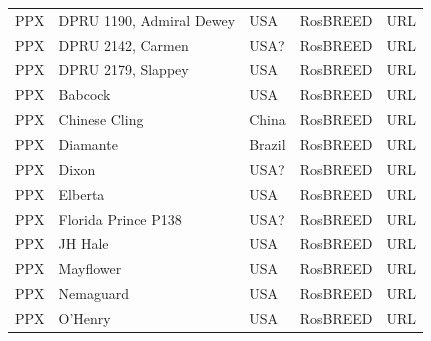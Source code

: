 \documentclass[12pt]{article}
\begin{document}
{\begin{center}
\begin{longtable}{lllll}
                 PP{\color{red}X} &DPRU 1190, Admiral Dewey&USA &RosBREED &URL \\
                 PP{\color{red}X} &DPRU 2142, Carmen &USA? &RosBREED &URL \\
                 PP{\color{red}X} &DPRU 2179, Slappey &USA &RosBREED &URL \\
                 PP{\color{red}X} &Babcock&USA &RosBREED &URL \\
                 PP{\color{red}X} &Chinese Cling&China &RosBREED &URL \\
                 PP{\color{red}X} &Diamante&Brazil &RosBREED &URL \\
                 PP{\color{red}X} &Dixon&USA? &RosBREED &URL \\
                 PP{\color{red}X} &Elberta&USA &RosBREED &URL \\
                 PP{\color{red}X} &Florida Prince P138&USA? &RosBREED &URL \\
                 PP{\color{red}X} &JH Hale&USA &RosBREED &URL \\
                 PP{\color{red}X} &Mayflower&USA &RosBREED &URL \\
                 PP{\color{red}X} &Nemaguard &USA &RosBREED &URL \\
                 PP{\color{red}X} &O’Henry &USA &RosBREED &URL \\

\end{longtable}
\end{center}}
\end{document}
